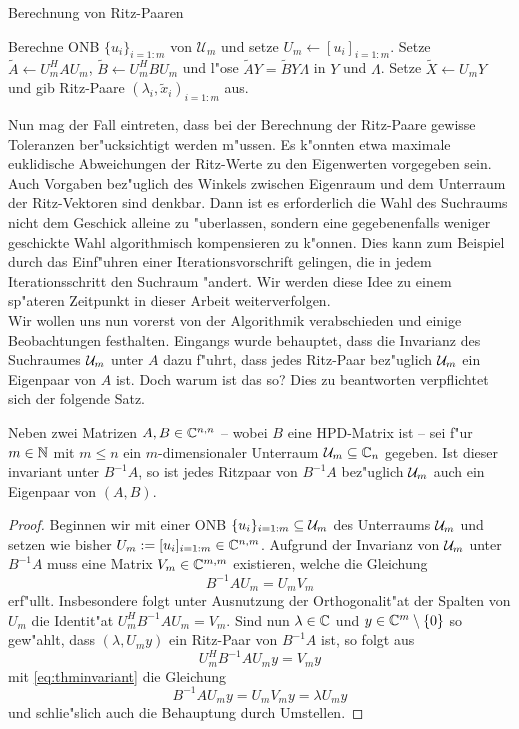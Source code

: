 \begin{algorithm}\label{alg:grp}
\caption{Berechnung von Ritz-Paaren}
\begin{algorithmic}[1]
\State Berechne ONB $\{u_i\}_{i=1:m}$ von $\mathcal{U}_m$ und setze $U_m\gets[u_i]_{i=1:m}$.
\State Setze $\widetilde{A}\gets U_m^H A U_m$,
$\widetilde{B} \gets U_m^H BU_m$ und
l"ose $\widetilde{A}Y = \widetilde{B}Y \Lambda$ in $Y$ und $\Lambda$.
\State Setze $\widetilde{X} \gets U_m Y$ und gib Ritz-Paare $(\lambda_i, \widetilde{x}_i)_{i=1:m}$ aus.
\end{algorithmic}
\end{algorithm}

Nun mag der Fall eintreten, dass bei der Berechnung der Ritz-Paare gewisse Toleranzen ber"ucksichtigt werden m"ussen.
Es k"onnten etwa maximale euklidische Abweichungen der Ritz-Werte zu den Eigenwerten vorgegeben sein.
Auch Vorgaben bez"uglich des Winkels zwischen Eigenraum und dem Unterraum der Ritz-Vektoren sind denkbar. Dann ist es erforderlich die Wahl des Suchraums nicht dem Geschick alleine zu "uberlassen, sondern eine gegebenenfalls weniger geschickte Wahl algorithmisch kompensieren zu k"onnen.
Dies kann zum Beispiel durch das Einf"uhren einer Iterationsvorschrift gelingen, die in jedem Iterationsschritt den Suchraum "andert.
Wir werden diese Idee zu einem sp"ateren Zeitpunkt in dieser Arbeit weiterverfolgen.\\

Wir wollen uns nun vorerst von der Algorithmik verabschieden und einige Beobachtungen
festhalten. Eingangs wurde behauptet, dass die Invarianz des Suchraumes $\mathcal{U}_m$ unter
$A$ dazu f"uhrt, dass jedes Ritz-Paar bez"uglich $\mathcal{U}_m$ ein Eigenpaar von $A$ ist.
Doch warum ist das so? Dies zu beantworten verpflichtet sich der folgende Satz.

\begin{thm}\label{thm:invariant}
Neben zwei Matrizen $A,B\in\mathbb{C}^{n,n}$ -- wobei $B$ eine HPD-Matrix ist -- sei f"ur
$m\in\mathbb{N}$ mit $m\le n$ ein $m$-dimensionaler Unterraum $\mathcal{U}_m \subseteq \mathbb{C}_n$ gegeben.
Ist dieser invariant unter $B^{-1}A$, so ist jedes Ritzpaar von $B^{-1}A$
bez"uglich $\mathcal{U}_m$ auch ein Eigenpaar von $(A,B)$.
\end{thm}

\begin{proof}
Beginnen wir mit einer ONB $\{u_i\}_{i=1:m}\subseteq\mathcal{U}_m$ des Unterraums $\mathcal{U}_m$
und setzen wie bisher $U_m := [u_i]_{i=1:m}\in\mathbb{C}^{n,m}$. Aufgrund der Invarianz
von $\mathcal{U}_m$ unter $B^{-1}A$ muss eine Matrix $V_m \in \mathbb{C}^{m,m}$ existieren, welche
die Gleichung
\begin{equation}\label{eq:thminvariant}
B^{-1}A U_m = U_m V_m
\end{equation}
erf"ullt. Insbesondere folgt unter Ausnutzung der Orthogonalit"at der Spalten
von $U_m$ die Identit"at $U_m^H B^{-1}A U_m = V_m$.
Sind nun $\lambda\in\mathbb{C}$ und $y\in\mathbb{C}^m\setminus\{0\}$ so gew"ahlt, dass $(\lambda, U_m y)$
ein Ritz-Paar von $B^{-1}A$ ist, so folgt aus
\[
U_m^H B^{-1}A U_m y = V_m y
\]
mit \eqref{eq:thminvariant} die Gleichung
\[
B^{-1}AU_m y = U_m V_m y = \lambda U_m y
\]
und schlie"slich auch die Behauptung durch Umstellen.
\end{proof}

